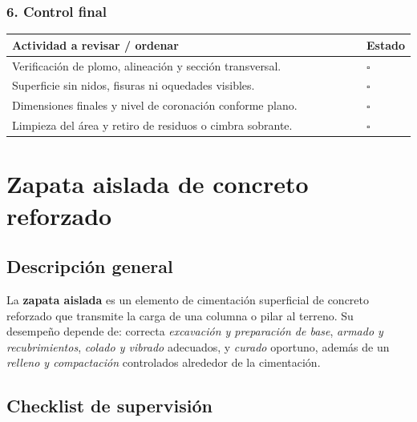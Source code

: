 \documentclass[12pt]{article}
\newcommand{\cbox}{\(\square\)} %
\begin{document}
	\subsubsection*{6. Control final}
	\begin{tabularx}{\linewidth}{>{\raggedright\arraybackslash}p{0.93\linewidth} >{\centering\arraybackslash}m{0.07\linewidth}}
		\toprule
		\textbf{Actividad a revisar / ordenar} & \textbf{Estado}\\
		\midrule
		Verificación de plomo, alineación y sección transversal. & \cbox \\
		Superficie sin nidos, fisuras ni oquedades visibles. & \cbox \\
		Dimensiones finales y nivel de coronación conforme plano. & \cbox \\
		Limpieza del área y retiro de residuos o cimbra sobrante. & \cbox \\
		\bottomrule
	\end{tabularx}
	
	
	
	
	
	\section{Zapata aislada de concreto reforzado}
	
	\subsection*{Descripción general}
	La \textbf{zapata aislada} es un elemento de cimentación superficial de concreto reforzado que transmite la carga de una columna o pilar al terreno. Su desempeño depende de: correcta \emph{excavación y preparación de base}, \emph{armado y recubrimientos}, \emph{colado y vibrado} adecuados, y \emph{curado} oportuno, además de un \emph{relleno y compactación} controlados alrededor de la cimentación.
	

	\subsection{Checklist de supervisión}
	
\end{document}
